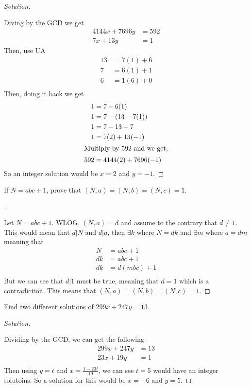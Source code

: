 \documentclass[11pt]{article}
\newenvironment{myproof}[1][\proofname]{%
  \begin{proof}[#1]$ $\par\nobreak\ignorespaces
}{%
  \end{proof}
}
\newenvironment{problem}[2][Problem]{\begin{trivlist}
\item[\hskip \labelsep {\bfseries #1}\hskip \labelsep {\bfseries #2.}]}{\end{trivlist}}
\newenvironment{solution}
  {\renewcommand\qedsymbol{$~$}\begin{proof}[Solution]$ $\par\nobreak\ignorespaces}
  {\end{proof}}
\begin{document}
\begin{solution}
  Diving by the GCD we get
  \begin{align*}
    4144x+7696y & =592 \\
    7x + 13y    & = 1
  \end{align*}
  Then, use UA
  \begin{align*}
    13 & = 7(1)+6   \\
    7  & = 6(1) + 1 \\
    6  & = 1(6) + 0 \\
  \end{align*}
  Then, doing it back we get
  \begin{align*}
    1   & = 7 - 6(1)           \\
    1   & = 7 - (13-7(1))      \\
    1   & = 7 - 13 + 7         \\
    1   & = 7(2) + 13(-1)      \\
    \intertext{Multiply by 592 and we get,}
    592 & = 4144(2) + 7696(-1) \\
  \end{align*}
  So an integer solution would be $x=2$ and $y=-1$.
\end{solution}



\begin{problem}{5}
If $N=abc+1$, prove that $(N,a)=(N,b)=(N,c)=1$.
\end{problem}

\begin{myproof}
  Let $N=abc+1$. WLOG, $(N,a)= d$ and assume to the contrary that $d\neq 1$. This would mean that $d|N$ and $d|a$, then $\exists k$ where $N=dk$ and $\exists m$ where $a=dm$ meaning that
  \begin{align*}
    N  & = abc +1     \\
    dk & = abc+ 1     \\
    dk & = d(mbc) + 1 \\
  \end{align*}
  But we can see that $d|1$ must be true, meaning that $d=1$ which is a contradiction. This means that $(N,a)=(N,b)=(N,c)=1$.
\end{myproof}


\begin{problem}{6}
Find two different solutions of $299x+247y=13$.
\end{problem}

\begin{solution}
  Dividing by the GCD, we can get the following
  \begin{align*}
    299x+ 247y & = 13 \\
    23x + 19y  & = 1  \\
  \end{align*}
  Then using $y=t$ and $x=\frac{1-23t}{19}$, we can see $t=5$ would have an integer solutoins. So a solution for this would be $x=-6$ and $y=5$.
\end{solution}
\end{document}
